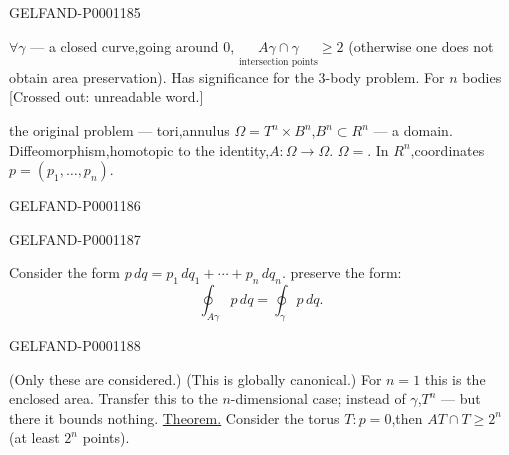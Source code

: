 \begin{GelfandAdjacentEvidence}{GELFAND-P000118}{5}

$\forall\gamma$ — a closed curve,going around $0$,
$\underset{\text{intersection points}}{A\gamma\cap\gamma}\ge2$ (otherwise one does not obtain area preservation).
Has significance for the $3$-body problem.
For $n$ bodies [Crossed out: unreadable word.]

the original problem — tori,annulus
$\Omega=T^n\times B^n$,$B^n\subset R^n$ — a domain.
Diffeomorphism,homotopic to the identity,$A:\Omega\longrightarrow\Omega$.
$\Omega={}$.
In $R^n$,coordinates $p=(p_1,\ldots,p_n)$.
\end{GelfandAdjacentEvidence}
\begin{GelfandAdjacentEvidence}{GELFAND-P000118}{6}


\end{GelfandAdjacentEvidence}
\begin{GelfandAdjacentEvidence}{GELFAND-P000118}{7}

Consider the form $p\,dq=p_1\,dq_1+\cdots+p_n\,dq_n$.
\noindent{} preserve the form:
\begin{equation*}\oint_{A\gamma}p\,dq=\oint_\gamma p\,dq.\end{equation*}
\end{GelfandAdjacentEvidence}
\begin{GelfandAdjacentEvidence}{GELFAND-P000118}{8}

(Only these are considered.) (This is globally canonical.)
For $n=1$ this is the enclosed area.
Transfer this to the $n$-dimensional case; instead of $\gamma$,$T^n$ —
but there it bounds nothing.
\underline{Theorem.} Consider the torus $T:p=0$,then $AT\cap T\ge2^n$
(at least $2^n$ points).
\end{GelfandAdjacentEvidence}
